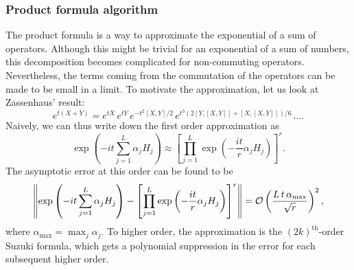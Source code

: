 \documentclass[a4paper]{report}
\begin{document}
\begin{spacing}{1.1}
\subsubsection{Product formula algorithm}

The product formula is a way to approximate the exponential of a sum of operators. Although this might be trivial for an exponential of a sum of numbers, this decomposition becomes complicated for non-commuting operators. Nevertheless, the terms coming from the commutation of the operators can be made to be small in a limit. To motivate the approximation, let us look at Zassenhaus' result:
\begin{equation}
    e^{t(X+Y)} = e^{tX}\,e^{tY}\,e^{-t^2 \left[X,Y\right] /2} \,e^{t^3(2\left[Y,\left[X,Y\right]\right] + \left[X,\left[X,Y\right]\right])/6} \, \dots . 
\end{equation}
Naively, we can thus write down the first order approximation as
\begin{equation}
\exp\left(-it\sum_{j=1}^{L}\alpha_j H_j \right) \approx  \left[\prod_{j=1}^{L}\exp\left(-\frac{it}{r} \alpha_j H_j\right)\right]^r.
\end{equation}
The asymptotic error at this order can be found to be
\begin{equation}
    \norm{\exp\left(-it\sum_{j=1}^{L}\alpha_j H_j \right) - \left[\prod_{j=1}^{L}\exp\left(-\frac{it}{r} \alpha_j H_j\right)\right]^r } = \mathcal{O}\left(\frac{L\,t\,\alpha_{\text{max}}}{ \sqrt{r}} \right)^2,
\end{equation}
where $\alpha_{\text{max}} = \max_j \alpha_j$. To higher order, the approximation is the $(2k)^{\text{th}}$-order Suzuki formula, which gets a polynomial suppression in the error for each subsequent higher order.



\end{spacing}
\end{document}
